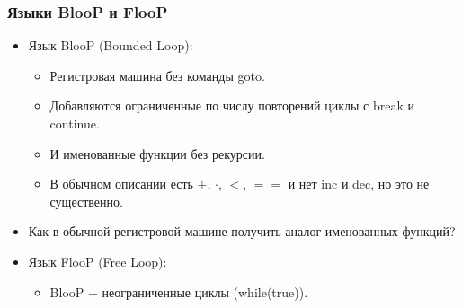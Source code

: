 \documentclass[10pt]{beamer}
\begin{document}
\begin{frame}
    \frametitle{Языки BlooP и FlooP}
    \begin{itemize}
        \item Язык BlooP (Bounded Loop):
        \begin{itemize}
            \item Регистровая машина без команды goto.
            \item Добавляются ограниченные по числу повторений циклы с break и continue.
            \item И именованные функции без рекурсии.
            \item В обычном описании есть $+$, $\cdot$, $<$, $==$ и нет inc и dec, но это не существенно.
        \end{itemize}
        \pause
        \item Как в обычной регистровой машине получить аналог именованных функций?
        \pause
        \item Язык FlooP (Free Loop):
        \begin{itemize}
            \item BlooP + неограниченные циклы (while(true)).
        \end{itemize}
    \end{itemize}
\end{frame}
\end{document}
